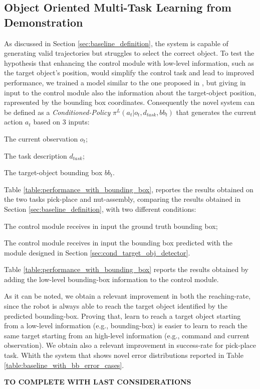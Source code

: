 \subsection{Object Oriented Multi-Task Learning from Demonstration}
\label{sec:obj_oriented_multi_task_lfd}
As discussed in Section \ref{sec:baseline_definition}, the system is capable of generating valid trajectories but struggles to select the correct object. To test the hypothesis that enhancing the control module with low-level information, such as the target object's position, would simplify the control task and lead to improved performance, we trained a model similar to the one proposed in \cite{mandi2022towards_more_generalizable_one_shot}, but giving in input to the control module also the information about the target-object position, rapresented by the bounding box coordinates.
Consequently the novel system can be defined as a \textit{Conditioned-Policy} $\pi^{L}(a_{t} | o_{t}, d_{task}, bb_{t})$ that generates the current action $a_{t}$ based on 3 inputs: \begin{enumerate*}[label=(\arabic*)]
    \item The current observation $o_{t}$;
    \item The task description $d_{task}$;
    \item The target-object bounding box $bb_{t}$.
\end{enumerate*}
\newline Table \ref{table:performance_with_bounding_box}, reportes the results obtained on the two tasks pick-place and nut-assembly, comparing the results obtained in Section \ref{sec:baseline_definition}, with two different conditions:
\begin{enumerate*}[label=(\arabic*)]
    \item The control module receives in input the ground truth bounding box;
    \item The control module receives in input the bounding box predicted with the module designed in Section \ref{sec:cond_target_obj_detector}.
\end{enumerate*}
\newline Table \ref{table:performance_with_bounding_box} reports the results obtained by adding the low-level bounding-box information to the control module.

As it can be noted, we obtain a relevant improvement in both the reaching-rate, since the robot is always able to reach the target object identified by the predicted bounding-box. Proving that, learn to reach a target object starting from a low-level information (e.g., bounding-box) is easier to learn to reach the same target starting from an high-level information (e.g., command and current observation). We obtain also a relevant improvement in success-rate for pick-place task. Whith the system that shows novel error distributions reported in Table \ref{table:baseline_with_bb_error_cases}.

\newline \textbf{TO COMPLETE WITH LAST CONSIDERATIONS}